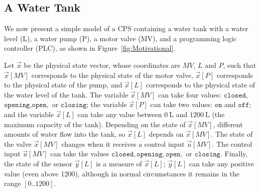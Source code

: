 \subsection*{A Water Tank}
We now present a simple model of a CPS containing a water tank with a water level (L), a water pump (P), a motor valve (MV), and a programming logic controller (PLC), as shown in Figure~\ref{fig:Motivational}.

Let $\vec{x}$ be the physical state vector, whose coordinates are $MV$, $L$ and $P$, such that $\vec{x}[MV]$ corresponds to the physical state of the motor valve, $\vec{x}[P]$ corresponds to the physical state of the pump, and $\vec{x}[L]$  corresponds to the physical state of the water level of the tank. The variable $\vec{x}[MV]$ can take four values: $\texttt{closed}$, $\texttt{opening}$,$\texttt{open},$ or $\texttt{closing}$; the variable $\vec{x}[P]$ can take two values: $\texttt{on}$ and $\texttt{off}$; and the variable $\vec{x}[L]$ can take any value between $0 ~\mathrm{L}$ and $1200 ~\mathrm{L}$ (the maximum capacity of the tank). 
Depending on the state of $\vec{x}[MV]$, different amounts of water flow into the tank, so $\vec{x}[L]$ depends on $\vec{x}[MV]$. The state of the valve $\vec{x}[MV]$ changes when it receives a control input $\vec{u}[MV]$. The control input $\vec{u}[MV]$ can take the values $\texttt{closed}, \texttt{opening},\texttt{open},$ or $\texttt{closing}$. Finally, the state of the sensor $\vec{y}[L]$ is a measure of $\vec{x}[L]$; $\vec{y}[L]$ can take any positive value (even above 1200), although in normal circumstances it remains in the range $[0..1200]$. 

